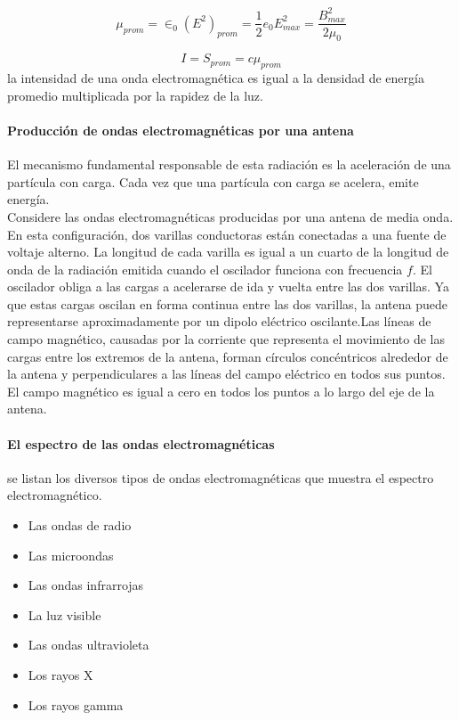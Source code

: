 \documentclass[10pt]{article}
\begin{document}
\begin{equation*}
	\mu_{prom} = \in_0 (E^2)_{prom} = \frac{1}{2} e_0 E^2_{max} = \dfrac{B^2_{max}}{2\mu_0}
\end{equation*}

\begin{equation*}
	I = S_{prom} = c\mu_{prom}
\end{equation*}
la intensidad de una onda electromagnética es igual a la densidad de
energía promedio multiplicada por la rapidez de la luz.

\paragraph{Producción de ondas
electromagnéticas por una antena}
El mecanismo fundamental responsable de
esta radiación es la aceleración de una partícula con carga. Cada vez que una partícula
con carga se acelera, emite energía.\\
\linebreak
Considere las ondas electromagnéticas producidas por una antena de media onda. En
esta configuración, dos varillas conductoras están conectadas a una fuente de voltaje
alterno. La longitud de cada varilla es igual a un cuarto de la longitud de onda de la radiación emitida cuando el
oscilador funciona con frecuencia $f$. El oscilador obliga a las cargas a acelerarse de ida y
vuelta entre las dos varillas. Ya que estas cargas oscilan en forma continua entre
las dos varillas, la antena puede representarse aproximadamente por un dipolo eléctrico
oscilante.Las líneas de campo magnético, causadas por la corriente que representa el
movimiento de las cargas entre los extremos de la antena, forman círculos concéntricos
alrededor de la antena y perpendiculares a las líneas del campo eléctrico en todos sus
puntos. El campo magnético es igual a cero en todos los puntos a lo largo del eje de la
antena.

\paragraph{El espectro de las ondas
electromagnéticas}

se listan los diversos tipos de ondas electromagnéticas que muestra el
espectro electromagnético.

\begin{itemize}
	\item Las ondas de radio
	\item Las microondas
	\item Las ondas infrarrojas
	\item La luz visible
	\item Las ondas ultravioleta
	\item Los rayos X
	\item Los rayos gamma
\end{itemize}
\end{document}
